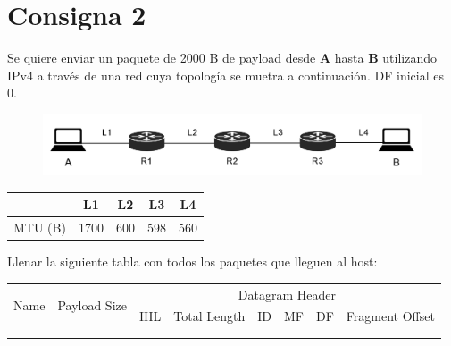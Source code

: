 \section*{Consigna 2}

Se quiere enviar un paquete de 2000 B de payload desde \textbf{A} hasta \textbf{B} utilizando IPv4 a través de una red cuya topología se muetra a continuación. DF inicial es 0.

\begin{figure}[H]
    \centering
    \includegraphics[width=0.9\linewidth]{Images/topologia.png}
\end{figure}

\vspace{-5mm}
{
\renewcommand{\arraystretch}{1.5}
\begin{table}[H]
    \centering
    \begin{tabular}{|c|c|c|c|c|}
    \hline
     & L1 & L2 & L3 & L4 \\ \hline
    MTU (B) & 1700 & 600 & 598 & 560\\ \hline
    \end{tabular}
\end{table}
}


Llenar la siguiente tabla con todos los paquetes que lleguen al host:

\begin{table}[H]
    \centering
    \renewcommand{\arraystretch}{1.5}
    \begin{tabular}{|c|c|crrrrr|}
    \hline
    \multirow{2}{*}{Name} & \multirow{2}{*}{Payload Size} & \multicolumn{6}{c|}{Datagram Header} \\ \cline{3-8} 
     &  & \multicolumn{1}{c|}{IHL} & \multicolumn{1}{c|}{Total Length} & \multicolumn{1}{c|}{ID} & \multicolumn{1}{c|}{MF} & \multicolumn{1}{c|}{DF} & \multicolumn{1}{c|}{Fragment Offset} \\ \hline
    \multicolumn{1}{|r|}{} & \multicolumn{1}{r|}{} & \multicolumn{1}{r|}{} & \multicolumn{1}{r|}{} & \multicolumn{1}{r|}{} & \multicolumn{1}{r|}{} & \multicolumn{1}{r|}{} &  \\ \hline
    \multicolumn{1}{|r|}{} & \multicolumn{1}{r|}{} & \multicolumn{1}{r|}{} & \multicolumn{1}{r|}{} & \multicolumn{1}{r|}{} & \multicolumn{1}{r|}{} & \multicolumn{1}{r|}{} &  \\ \hline
    \end{tabular}
\end{table}

